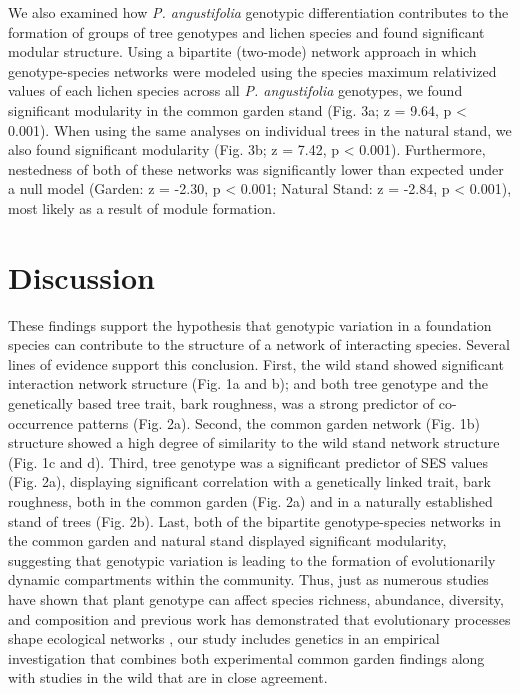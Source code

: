 \documentclass[fleqn,10pt]{wlscirep}
\begin{document}
We also examined how \textit{P. angustifolia} genotypic
differentiation contributes to the formation of groups of tree
genotypes and lichen species and found significant modular
structure. Using a bipartite (two-mode) network approach in which
genotype-species networks were modeled using the species maximum
relativized values of each lichen species across all
\textit{P. angustifolia} genotypes, we found significant modularity in
the common garden stand (Fig. 3a; z = 9.64, p < 0.001). When using the
same analyses on individual trees in the natural stand, we also found
significant modularity (Fig. 3b; z = 7.42, p < 0.001). Furthermore,
nestedness of both of these networks was significantly lower than
expected under a null model (Garden: z = -2.30, p < 0.001; Natural
Stand: z = -2.84, p < 0.001), most likely as a result of module
formation.  



\section*{Discussion}


These findings support the hypothesis that genotypic variation in a
foundation species can contribute to the structure of a network of
interacting species. Several lines of evidence support this
conclusion. First, the wild stand showed significant interaction
network structure (Fig. 1a and b); and both tree genotype and the
genetically based tree trait, bark roughness, was a strong predictor
of co-occurrence patterns (Fig. 2a). Second, the common garden network
(Fig. 1b) structure showed a high degree of similarity to the wild
stand network structure (Fig. 1c and d). Third, tree genotype was a
significant predictor of SES values (Fig. 2a), displaying significant
correlation with a genetically linked trait, bark roughness, both in
the common garden (Fig. 2a) and in a naturally established stand of
trees (Fig. 2b). Last, both of the bipartite genotype-species networks
in the common garden and natural stand displayed significant
modularity, suggesting that genotypic variation is leading to the
formation of evolutionarily dynamic compartments within the
community. Thus, just as numerous studies have shown that plant
genotype can affect species richness, abundance, diversity, and
composition and previous work has demonstrated that evolutionary
processes shape ecological networks \cite{Guimaraes2011,
  Moya-Larano2011}, our study includes genetics in an empirical
investigation that combines both experimental common garden findings
along with studies in the wild that are in close agreement.
\end{document}
